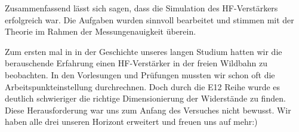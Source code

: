 Zusammenfassend lässt sich sagen, dass die Simulation des HF-Verstärkers erfolgreich war. Die Aufgaben wurden sinnvoll bearbeitet und stimmen mit der Theorie im Rahmen der Messungenauigkeit überein.

Zum ersten mal in in der Geschichte unseres langen Studium hatten wir die berauschende Erfahrung einen HF-Verstärker in der freien Wildbahn zu beobachten.
In den Vorlesungen und Prüfungen mussten wir schon oft die Arbeitspunkteinstellung durchrechnen. Doch durch die E12 Reihe wurde es deutlich schwieriger
die richtige Dimensionierung der Widerstände zu finden. Diese Herausforderung war uns zum Anfang des Versuches nicht bewusst.
Wir haben alle drei unseren Horizont erweitert und freuen uns auf mehr:)




\clearpage
